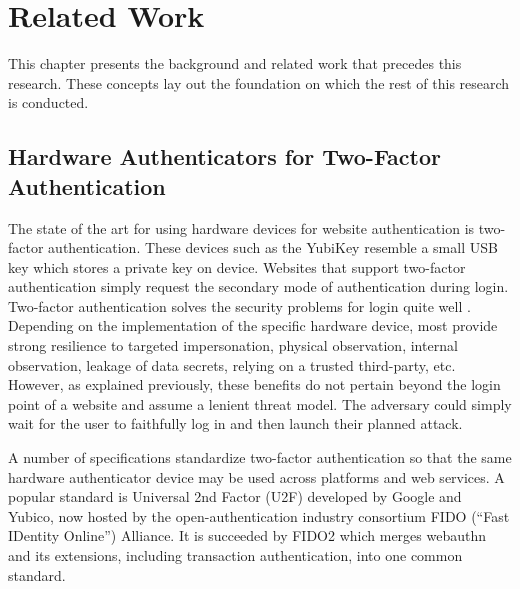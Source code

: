 \chapter{Related Work}\label{Chap:RelatedWork}

This chapter presents the background and related work that precedes this research. These concepts lay out the foundation on which the rest of this research is conducted.

\section{Hardware Authenticators for \newline Two-Factor Authentication}\label{Sec:HardwareAuthenticators_2FA}

The state of the art for using hardware devices for website authentication is two-factor authentication. These devices such as the YubiKey \cite{https://www.yubico.com/products/} resemble a small USB key which stores a private key on device. Websites that support two-factor authentication simply request the secondary mode of authentication during login. Two-factor authentication solves the security problems for login quite well \cite{TODO-quest-to-remove-passwords}. Depending on the implementation of the specific hardware device, most provide strong resilience to targeted impersonation, physical observation, internal observation, leakage of data secrets, relying on a trusted third-party, etc. However, as explained previously, these benefits do not pertain beyond the login point of a website and assume a lenient threat model. The adversary could simply wait for the user to faithfully log in and then launch their planned attack. 


A number of specifications standardize two-factor authentication so that the same hardware authenticator device may be used across platforms and web services. A popular standard is Universal 2nd Factor (U2F) \cite{https://www.yubico.com/authentication-standards/fido-u2f/} developed by Google and Yubico, now hosted by the open-authentication industry consortium FIDO (``Fast IDentity Online'') Alliance. It is succeeded by FIDO2 \cite{https://fidoalliance.org/fido2/} which merges webauthn and its extensions, including transaction authentication, into one common standard.

